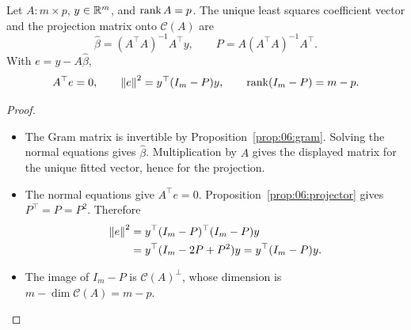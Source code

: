 \begin{proposition}\label{prop:06:full-rank}
Let \(A:m\times p\), \(y\in\mathbb R^m\), and \(\operatorname{rank} A=p\).
The unique least squares coefficient vector and
the projection matrix onto \(\mathcal C(A)\) are
\[
\hat\beta=(A^\top A)^{-1}A^\top y,\qquad
P=A(A^\top A)^{-1}A^\top.
\]
With \(e=y-A\hat\beta\),
\[
A^\top e=0,\qquad
\left\lVert e\right\rVert^2=y^\top(I_m-P)y,\qquad \operatorname{rank}(I_m-P)=m-p.
\]
\end{proposition}
\begin{proof}
\begin{itemize}
\item The Gram matrix is invertible by Proposition~\ref{prop:06:gram}.
  Solving the normal equations gives \(\hat\beta\). Multiplication by
  \(A\) gives the displayed matrix for the unique fitted vector,
  hence for the projection.
\item The normal equations give \(A^\top e=0\).
  Proposition~\ref{prop:06:projector} gives
  \(P^\top=P=P^2\). Therefore
  \[
  \begin{aligned}
  \left\lVert e\right\rVert^2&=y^\top(I_m-P)^\top(I_m-P)y\\
  &=y^\top(I_m-2P+P^2)y=y^\top(I_m-P)y.
  \end{aligned}
  \]
\item The image of \(I_m-P\) is \(\mathcal C(A)^\perp\), whose
  dimension is \(m-\dim\mathcal C(A)=m-p\).
\end{itemize}
\end{proof}

